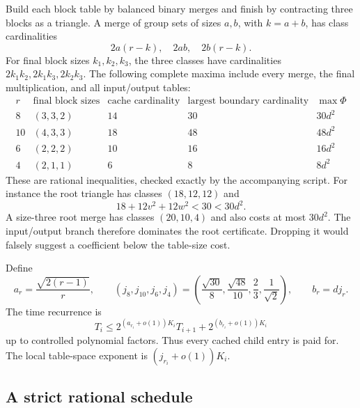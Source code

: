 Build each block table by balanced binary merges and finish by contracting
three blocks as a triangle. A merge of group sets of sizes $a,b$, with
$k=a+b$, has class cardinalities
\[
 2a(r-k),\quad 2ab,\quad 2b(r-k).
\]
For final block sizes $k_1,k_2,k_3$, the three classes have cardinalities
$2k_1k_2,2k_1k_3,2k_2k_3$. The following complete maxima include every merge,
the final multiplication, and all input/output tables:
\[
\begin{array}{c|c|c|c|c}
 r&\text{final block sizes}&\text{cache cardinality}&
 \text{largest boundary cardinality}&\max\Phi\\\hline
 8&(3,3,2)&14&30&30d^2\\
 10&(4,3,3)&18&48&48d^2\\
 6&(2,2,2)&10&16&16d^2\\
 4&(2,1,1)&6&8&8d^2
\end{array}
\]
These are rational inequalities, checked exactly by the accompanying
script. For instance the root triangle has classes $(18,12,12)$ and
\[
 18+12v^2+12w^2<30<30d^2.
\]
A size-three root merge has classes $(20,10,4)$ and also costs at most
$30d^2$. The input/output branch therefore dominates the root certificate.
Dropping it would falsely suggest a coefficient below the table-size cost.

Define
\[
 a_r=\frac{\sqrt{2(r-1)}}r,\qquad
 (j_8,j_{10},j_6,j_4)=
 \left(\frac{\sqrt{30}}8,\frac{\sqrt{48}}{10},
       \frac23,\frac1{\sqrt2}\right),\qquad b_r=dj_r.
\]
The time recurrence is
\begin{equation}\label{eq:rectangular-new-recurrence}
 T_i\le 2^{(a_{r_i}+o(1))K_i}T_{i+1}
       +2^{(b_{r_i}+o(1))K_i}
\end{equation}
up to controlled polynomial factors. Thus every cached child entry is paid
for. The local table-space exponent is $(j_{r_i}+o(1))K_i$.

\subsection{A strict rational schedule}

